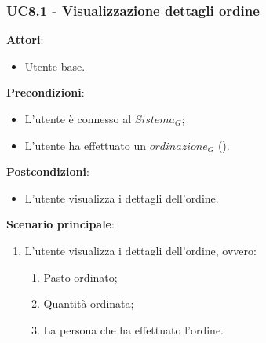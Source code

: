 \subsubsection{UC8.1 - Visualizzazione dettagli ordine}\label{usecase:8_1}
\textbf{Attori}:
\begin{itemize}
    \item Utente base.
\end{itemize}
\textbf{Precondizioni}:
\begin{itemize}
    \item L'utente è connesso al $\textit{Sistema}_G$;
    \item L'utente ha effettuato un $\textit{ordinazione}_G$ ().
\end{itemize}
\textbf{Postcondizioni}:
\begin{itemize}
    \item L'utente visualizza i dettagli dell'ordine.
\end{itemize}
\textbf{Scenario principale}:
\begin{enumerate}
    \item L'utente visualizza i dettagli dell'ordine, ovvero:
    \begin{enumerate}
        \item Pasto ordinato;
        \item Quantità ordinata;
        \item La persona che ha effettuato l'ordine.
    \end{enumerate}
\end{enumerate}
\newpage